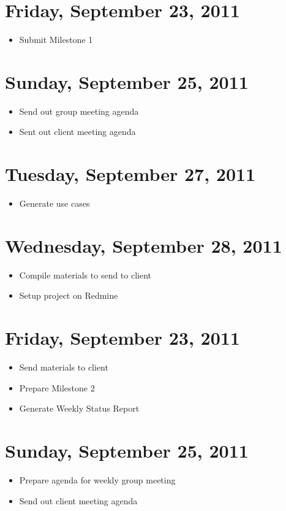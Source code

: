 \documentclass{article}
\begin{document}
\section{Friday, September 23, 2011}
\begin{itemize}
\item Submit Milestone 1
\end{itemize}

\section{Sunday, September 25, 2011}
\begin{itemize}
\item Send out group meeting agenda
\item Sent out client meeting agenda
\end{itemize}

\section{Tuesday, September 27, 2011}
\begin{itemize}
\item Generate use cases
\end{itemize}

\section{Wednesday, September 28, 2011}
\begin{itemize}
\item Compile materials to send to client
\item Setup project on Redmine
\end{itemize}

\section{Friday, September 23, 2011}
\begin{itemize}
\item Send materials to client
\item Prepare Milestone 2
\item Generate Weekly Status Report
\end{itemize}

\section{Sunday, September 25, 2011}
\begin{itemize}
\item Prepare agenda for weekly group meeting
\item Send out client meeting agenda
\end{itemize}
\end{document}
